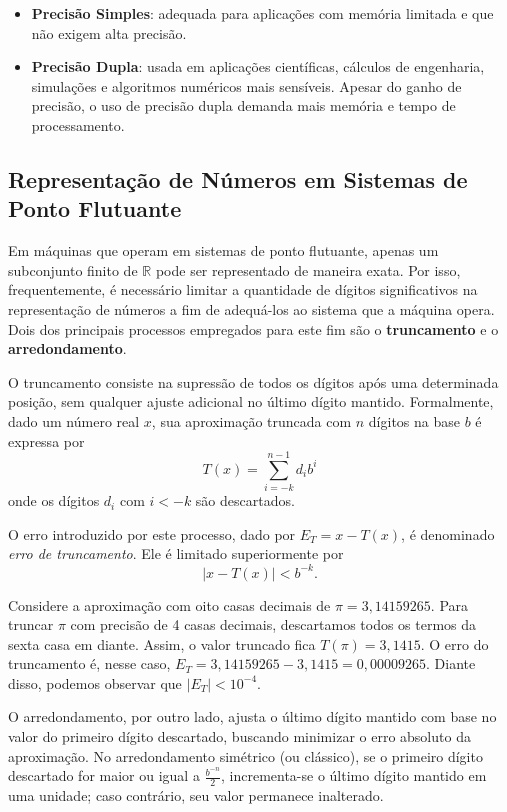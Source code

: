 \begin{itemize}
  \item \textbf{Precisão Simples}: adequada para aplicações com memória limitada e que não exigem alta precisão.
  \item \textbf{Precisão Dupla}: usada em aplicações científicas, cálculos de engenharia, simulações e algoritmos numéricos mais sensíveis.
Apesar do ganho de precisão, o uso de precisão dupla demanda mais memória e tempo de processamento.


\end{itemize}



\newpage
\subsection{Representação de Números em Sistemas de Ponto Flutuante}

Em máquinas que operam em sistemas de ponto flutuante, apenas um subconjunto finito de \(\mathbb{R} \) pode ser representado de maneira exata. Por isso, frequentemente, é necessário limitar a quantidade de dígitos significativos na representação de números a fim de  adequá-los ao sistema que a máquina opera. Dois dos principais processos empregados para este fim são o \textbf{truncamento} e o \textbf{arredondamento}.

O truncamento consiste na supressão de todos os dígitos após uma determinada posição, sem qualquer ajuste adicional no último dígito mantido. Formalmente, dado um número real \( x \), sua aproximação truncada com \( n \) dígitos na base \( b \) é expressa por
\[
T(x) = \sum_{i = -k}^{n-1} d_i b^i
\]
onde os dígitos \( d_i \) com \( i < -k \) são descartados.

O erro introduzido por este processo, dado por $E_T = x-T(x)$, é denominado \textit{erro de truncamento}. Ele é limitado superiormente por
\begin{equation}
    |x - T(x)| < b^{-k}.
\end{equation}
\begin{ex}
Considere a aproximação com oito casas decimais de \(\pi = 3,14159265\).
Para truncar $\pi$  com precisão de 4 casas decimais, descartamos todos os termos da sexta casa em diante. Assim, o valor truncado fica
$T(\pi) = 3,1415$.
O erro do truncamento é, nesse caso, $E_T = 3,14159265 - 3,1415 = 0,00009265$. Diante disso, podemos observar que $|E_T| < 10^{-4}$.
\end{ex}

O arredondamento, por outro lado, ajusta o último dígito mantido com base no valor do primeiro dígito descartado, buscando minimizar o erro absoluto da aproximação. No arredondamento simétrico (ou clássico), se o primeiro dígito descartado for maior ou igual a \( \frac{b^{-n}}{2} \), incrementa-se o último dígito mantido em uma unidade; caso contrário, seu valor permanece inalterado.

